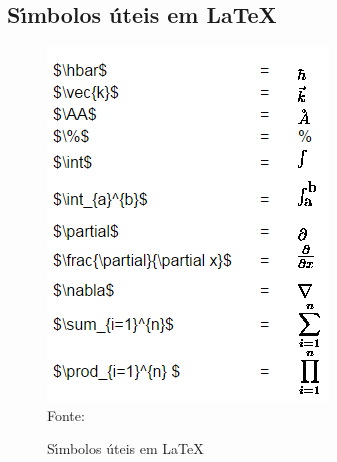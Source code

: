 \begin{anexosenv}
\chapter{S\'{\i}mbolos \'uteis em \LaTeX}
\begin{figure}[H]
	\begin{center}
		\caption{\label{fig_anexoc}S\'{\i}mbolos \'uteis em \LaTeX}
		\includegraphics[scale=1.0]{USPSC-img/USPSC-SimbolosUteis.png} \\
		Fonte: 
	\end{center}	
\end{figure}



\end{anexosenv}
